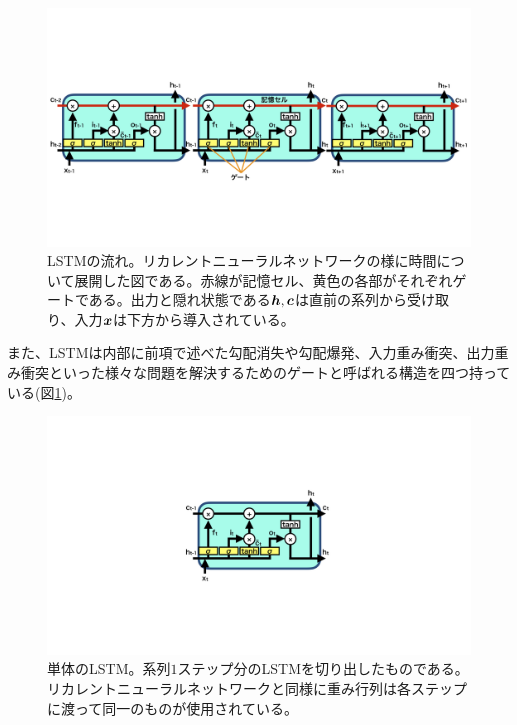 \begin{figure}[htbp]
 \centering
 \includegraphics[trim = 0 200 0 200, width=1.0\textwidth, clip]{Figure/2DeepLearning/10LongShortTermMemory.png}
 \caption[LSTMの流れ]{LSTMの流れ。リカレントニューラルネットワークの様に時間について展開した図である。赤線が記憶セル、黄色の各部がそれぞれゲートである。出力と隠れ状態である${\mbox{\boldmath{$h$}}},{\mbox{\boldmath{$c$}}}$は直前の系列から受け取り、入力${\mbox{\boldmath{$x$}}}$は下方から導入されている。}
 \label{10LongShortTermMemory}
\end{figure}

また、LSTMは内部に前項で述べた勾配消失や勾配爆発、入力重み衝突、出力重み衝突といった様々な問題を解決するためのゲートと呼ばれる構造を四つ持っている(図\ref{10LongShortTermMemory})。

\begin{figure}[htbp]
 \centering
 \includegraphics[trim = 0 300 0 300, width=1.0\textwidth, clip]{Figure/2DeepLearning/11LSTM.png}
 \caption[単体のLSTM]{単体のLSTM。系列$1$ステップ分のLSTMを切り出したものである。リカレントニューラルネットワークと同様に重み行列は各ステップに渡って同一のものが使用されている。}
 \label{11LSTM}
\end{figure}

